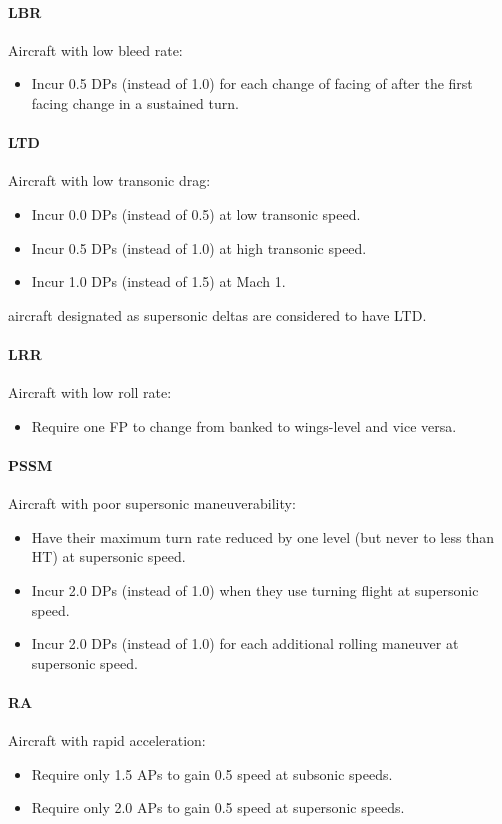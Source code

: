 \documentclass[10pt]{article}
\begin{document}
\paragraph{LBR} Aircraft with low bleed rate:
\begin{itemize}
    \item Incur 0.5 DPs (instead of 1.0) for each change of facing of  after the first facing change in a sustained turn.
\end{itemize}

\paragraph{LTD} Aircraft with low transonic drag:
\begin{itemize}
    \item Incur 0.0 DPs (instead of 0.5) at low transonic speed.
    \item Incur 0.5 DPs (instead of 1.0) at high transonic speed.
    \item Incur 1.0 DPs (instead of 1.5) at Mach 1.
\end{itemize}
{\AirSup} aircraft designated as supersonic deltas are considered to have LTD.

\paragraph{LRR} Aircraft with low roll rate:
\begin{itemize}
    \item Require one FP to change from banked to wings-level and vice versa.
\end{itemize}

\paragraph{PSSM} Aircraft with poor supersonic maneuverability:
\begin{itemize}
    \item Have their maximum turn rate reduced by one level (but never to less than HT) at supersonic speed.
    \item Incur 2.0 DPs (instead of 1.0) when they use turning flight at supersonic speed.
    \item Incur 2.0 DPs (instead of 1.0) for each additional rolling maneuver at supersonic speed.
\end{itemize}

\paragraph{RA} Aircraft with rapid acceleration:
\begin{itemize}
    \item Require only 1.5 APs to gain 0.5 speed at subsonic speeds.
    \item Require only 2.0 APs to gain 0.5 speed at supersonic speeds.
\end{itemize}
\end{document}
